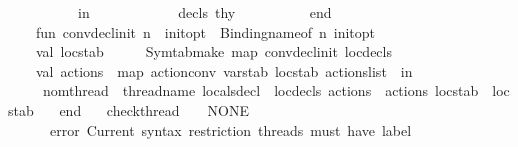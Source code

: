 \begin{isabellebody}
\ \ \ \ \ \ \ \ \ \ in\isanewline
\ \ \ \ \ \ \ \ \ \ \ \ {\isacharparenleft}{\kern0pt}decls{\isacharcomma}{\kern0pt}\ thy{}{\isacharparenright}{\kern0pt}\isanewline
\ \ \ \ \ \ \ \ \ \ end\isanewline
\isanewline
\ \ \ \ fun\ conv{\isacharunderscore}{\kern0pt}decl{\isacharunderscore}{\kern0pt}init\ {\isacharparenleft}{\kern0pt}{\isacharparenleft}{\kern0pt}n{\isacharcomma}{\kern0pt}\ {\isacharunderscore}{\kern0pt}{\isacharparenright}{\kern0pt}{\isacharcomma}{\kern0pt}\ init{\isacharunderscore}{\kern0pt}opt{\isacharparenright}{\kern0pt}\ {\isacharequal}{\kern0pt}\ {\isacharparenleft}{\kern0pt}Binding{\isachardot}{\kern0pt}name{\isacharunderscore}{\kern0pt}of\ n{\isacharcomma}{\kern0pt}\ init{\isacharunderscore}{\kern0pt}opt{\isacharparenright}{\kern0pt}\isanewline
\ \ \ \ val\ locstab{\isacharprime}{\kern0pt}\ \ \ \ \ {\isacharequal}{\kern0pt}\ Symtab{\isachardot}{\kern0pt}make\ {\isacharparenleft}{\kern0pt}map\ conv{\isacharunderscore}{\kern0pt}decl{\isacharunderscore}{\kern0pt}init\ loc{\isacharunderscore}{\kern0pt}decls{\isacharprime}{\kern0pt}{\isacharparenright}{\kern0pt}\isanewline
\ \ \ \ val\ actions{\isacharprime}{\kern0pt}\ {\isacharequal}{\kern0pt}\ map\ {\isacharparenleft}{\kern0pt}action{\isacharunderscore}{\kern0pt}conv\ vars{\isacharunderscore}{\kern0pt}tab\ locstab{\isacharprime}{\kern0pt}{\isacharparenright}{\kern0pt}\ actions{\isacharunderscore}{\kern0pt}list\ \ in\isanewline
\ \ \ \ {\isacharbraceleft}{\kern0pt}\ nom{\isacharunderscore}{\kern0pt}thread\ {\isacharequal}{\kern0pt}\ thread{\isacharunderscore}{\kern0pt}name{\isacharcomma}{\kern0pt}\ locals{\isacharunderscore}{\kern0pt}decl\ {\isacharequal}{\kern0pt}\ loc{\isacharunderscore}{\kern0pt}decls{\isacharprime}{\kern0pt}{\isacharcomma}{\kern0pt}\ actions\ {\isacharequal}{\kern0pt}\ actions{\isacharprime}{\kern0pt}{\isacharcomma}{\kern0pt}\ locstab\ {\isacharequal}{\kern0pt}\ locstab{\isacharprime}{\kern0pt}\ {\isacharbraceright}{\kern0pt}\isanewline
\ \ end\isanewline
\ \ {\isacharbar}{\kern0pt}\ check{\isacharunderscore}{\kern0pt}thread\ {\isacharunderscore}{\kern0pt}\ {\isacharunderscore}{\kern0pt}\ {\isacharunderscore}{\kern0pt}\ {\isacharparenleft}{\kern0pt}{\isacharparenleft}{\kern0pt}NONE{\isacharcomma}{\kern0pt}\ {\isacharunderscore}{\kern0pt}{\isacharparenright}{\kern0pt}{\isacharcomma}{\kern0pt}\ {\isacharunderscore}{\kern0pt}{\isacharparenright}{\kern0pt}\ {\isacharequal}{\kern0pt}\isanewline
\ \ \ \ \ \ error\ {\isachardoublequote}{\kern0pt}Current\ syntax\ restriction{\isacharcolon}{\kern0pt}\ threads\ must\ have\ label{\isachardot}{\kern0pt}{\isachardoublequote}{\kern0pt}\isanewline

\end{isabellebody}
